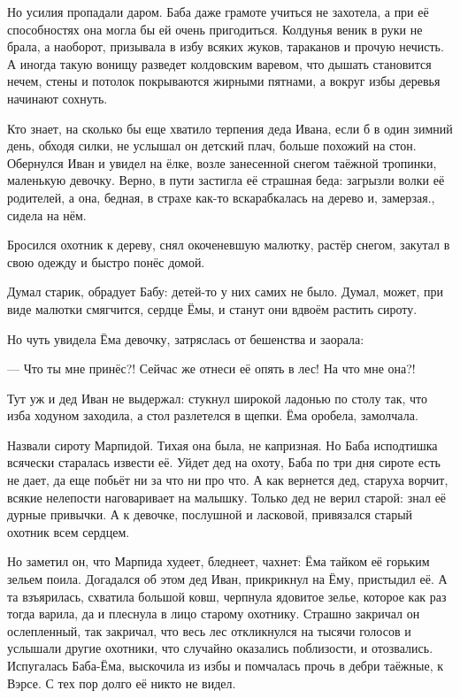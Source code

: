 \documentclass[12pt, a4paper, openany]{book}
\begin{document}
	Но усилия пропадали даром. Баба даже грамоте учиться не захотела, а при её способностях она могла бы ей очень пригодиться. Колдунья веник в руки не брала, а наоборот, призывала в избу всяких жуков, тараканов и прочую нечисть. А иногда такую вонищу разведет колдовским варевом, что дышать становится нечем, стены и потолок покрываются жирными пятнами, а вокруг избы деревья начинают сохнуть.
	
	Кто знает, на сколько бы еще хватило терпения деда Ивана, если б в один зимний день, обходя силки, не услышал он детский плач, больше похожий на стон. Обернулся Иван и увидел на ёлке, возле занесенной снегом таёжной тропинки, маленькую девочку. Верно, в пути застигла её страшная беда: загрызли волки её родителей, а она, бедная, в страхе как-то вскарабкалась на дерево и, замерзая., сидела на нём.
	
	Бросился охотник к дереву, снял окоченевшую малютку, растёр снегом, закутал в свою одежду и быстро понёс домой.
	
	Думал старик, обрадует Бабу: детей-то у них самих не было. Думал, может, при виде малютки смягчится, сердце Ёмы, и станут они вдвоём растить сироту.
	
	Но чуть увидела Ёма девочку, затряслась от бешенства и заорала:
	
	— Что ты мне принёс?! Сейчас же отнеси её опять в лес! На что мне она?!
	
	Тут уж и дед Иван не выдержал: стукнул широкой ладонью по столу так, что изба ходуном заходила, а стол разлетелся в щепки. Ёма оробела, замолчала.
	
	Назвали сироту Марпидой. Тихая она была, не капризная. Но Баба исподтишка всячески старалась извести её. Уйдет дед на охоту, Баба по три дня сироте есть не дает, да еще побьёт ни за что ни про что. А как вернется дед, старуха ворчит, всякие нелепости наговаривает на малышку. Только дед не верил старой: знал её дурные привычки. А к девочке, послушной и ласковой, привязался старый охотник всем сердцем.
	
	Но заметил он, что Марпида худеет, бледнеет, чахнет: Ёма тайком её горьким зельем поила. Догадался об этом дед Иван, прикрикнул на Ёму, пристыдил её. А та взъярилась, схватила большой ковш, черпнула ядовитое зелье, которое как раз тогда варила, да и плеснула в лицо старому охотнику. Страшно закричал он ослепленный, так закричал, что весь лес откликнулся на тысячи голосов и услышали другие охотники, что случайно оказались поблизости, и отозвались. Испугалась Баба-Ёма, выскочила из избы и помчалась прочь в дебри таёжные, к Вэрсе. С тех пор долго её никто не видел.
	
\end{document}
